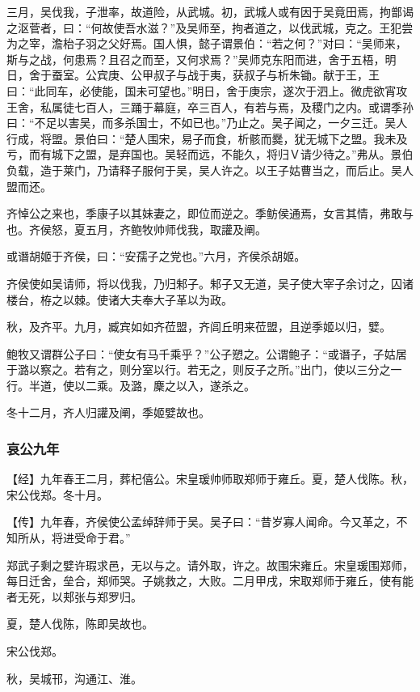 \documentclass[]{article}
\begin{document}
三月，吴伐我，子泄率，故道险，从武城。初，武城人或有因于吴竟田焉，拘鄫谒之沤菅者，曰：``何故使吾水滋？''及吴师至，拘者道之，以伐武城，克之。王犯尝为之宰，澹枱子羽之父好焉。国人惧，懿子谓景伯：``若之何？''对曰：``吴师来，斯与之战，何患焉？且召之而至，又何求焉？''吴师克东阳而进，舍于五梧，明日，舍于蚕室。公宾庚、公甲叔子与战于夷，获叔子与析朱锄。献于王，王曰：``此同车，必使能，国未可望也。''明日，舍于庚宗，遂次于泗上。微虎欲宵攻王舍，私属徒七百人，三踊于幕庭，卒三百人，有若与焉，及稷门之内。或谓季孙曰：``不足以害吴，而多杀国士，不如已也。''乃止之。吴子闻之，一夕三迁。吴人行成，将盟。景伯曰：``楚人围宋，易子而食，析骸而爨，犹无城下之盟。我未及亏，而有城下之盟，是弃国也。吴轻而远，不能久，将归Ｖ请少待之。''弗从。景伯负载，造于莱门，乃请释子服何于吴，吴人许之。以王子姑曹当之，而后止。吴人盟而还。

齐悼公之来也，季康子以其妹妻之，即位而逆之。季鲂侯通焉，女言其情，弗敢与也。齐侯怒，夏五月，齐鲍牧帅师伐我，取讙及阐。

或谮胡姬于齐侯，曰：``安孺子之党也。''六月，齐侯杀胡姬。

齐侯使如吴请师，将以伐我，乃归邾子。邾子又无道，吴子使大宰子余讨之，囚诸楼台，栫之以棘。使诸大夫奉大子革以为政。

秋，及齐平。九月，臧宾如如齐莅盟，齐闾丘明来莅盟，且逆季姬以归，嬖。

鲍牧又谓群公子曰：``使女有马千乘乎？''公子愬之。公谓鲍子：``或谮子，子姑居于潞以察之。若有之，则分室以行。若无之，则反子之所。''出门，使以三分之一行。半道，使以二乘。及潞，麇之以入，遂杀之。

冬十二月，齐人归讙及阐，季姬嬖故也。

\hypertarget{header-n3134}{%
\subsubsection{哀公九年}\label{header-n3134}}

【经】九年春王二月，葬杞僖公。宋皇瑗帅师取郑师于雍丘。夏，楚人伐陈。秋，宋公伐郑。冬十月。

【传】九年春，齐侯使公孟绰辞师于吴。吴子曰：``昔岁寡人闻命。今又革之，不知所从，将进受命于君。''

郑武子剩之嬖许瑕求邑，无以与之。请外取，许之。故围宋雍丘。宋皇瑗围郑师，每日迁舍，垒合，郑师哭。子姚救之，大败。二月甲戌，宋取郑师于雍丘，使有能者无死，以郏张与郑罗归。

夏，楚人伐陈，陈即吴故也。

宋公伐郑。

秋，吴城邗，沟通江、淮。
\end{document}
